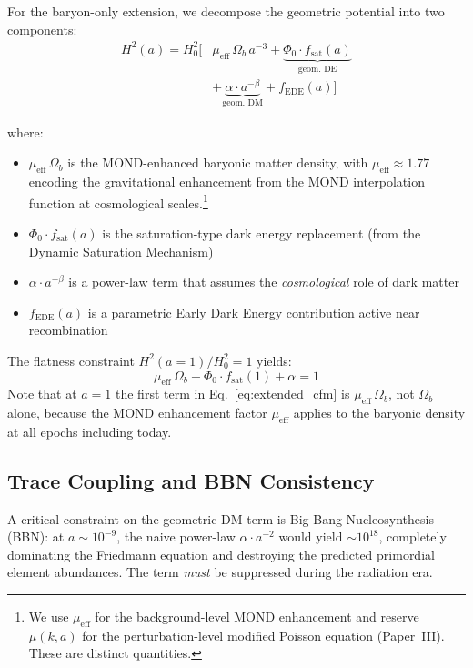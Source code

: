 \documentclass[aps,prd,twocolumn,superscriptaddress,nofootinbib,floatfix]{revtex4-2}
\begin{document}
For the baryon-only extension, we decompose the geometric potential into two components:
\begin{equation}
\begin{split}
H^2(a) = H_0^2 \Big[&\mu_{\mathrm{eff}}\,\Omega_b\,a^{-3} + \underbrace{\Phi_0 \cdot f_{\mathrm{sat}}(a)}_{\text{geom.\ DE}} \\
&+ \underbrace{\alpha \cdot a^{-\beta}}_{\text{geom.\ DM}} + f_{\mathrm{EDE}}(a)\Big]
\end{split}
\label{eq:extended_cfm}
\end{equation}

where:
\begin{itemize}
\item $\mu_{\mathrm{eff}}\,\Omega_b$ is the MOND-enhanced baryonic matter density, with $\mu_{\mathrm{eff}} \approx 1.77$ encoding the gravitational enhancement from the MOND interpolation function at cosmological scales.\footnote{We use $\mu_{\mathrm{eff}}$ for the background-level MOND enhancement and reserve $\mu(k,a)$ for the perturbation-level modified Poisson equation (Paper~III). These are distinct quantities.}
\item $\Phi_0 \cdot f_{\mathrm{sat}}(a)$ is the saturation-type dark energy replacement (from the Dynamic Saturation Mechanism)
\item $\alpha \cdot a^{-\beta}$ is a power-law term that assumes the \textit{cosmological} role of dark matter
\item $f_{\mathrm{EDE}}(a)$ is a parametric Early Dark Energy contribution active near recombination
\end{itemize}

The flatness constraint $H^2(a{=}1)/H_0^2 = 1$ yields:
\begin{equation}
\mu_{\mathrm{eff}}\,\Omega_b + \Phi_0 \cdot f_{\mathrm{sat}}(1) + \alpha = 1
\end{equation}
Note that at $a=1$ the first term in Eq.~\eqref{eq:extended_cfm} is $\mu_{\mathrm{eff}}\,\Omega_b$, not $\Omega_b$ alone, because the MOND enhancement factor $\mu_{\mathrm{eff}}$ applies to the baryonic density at all epochs including today.

\subsection{Trace Coupling and BBN Consistency}
\label{subsec:trace_coupling}

A critical constraint on the geometric DM term is Big Bang Nucleosynthesis (BBN): at $a \sim 10^{-9}$, the naive power-law $\alpha \cdot a^{-2}$ would yield $\sim 10^{18}$, completely dominating the Friedmann equation and destroying the predicted primordial element abundances. The term \textit{must} be suppressed during the radiation era.
\end{document}
